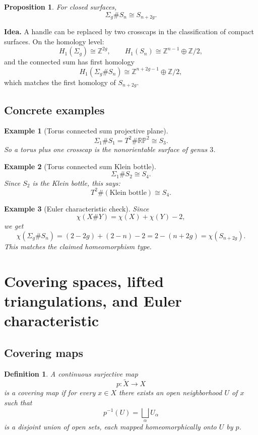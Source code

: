 \documentclass[12pt,a4paper]{article}
\newcommand{\Z}{\mathbb{Z}}
\newcommand{\RP}{\mathbb{RP}}
\newcommand{\Chi}{\chi}
\newtheorem{proposition}{Proposition}
\newtheorem{example}{Example}
\theoremstyle{notespace}
\newtheorem{definition}{Definition}[section]
\begin{document}
	\begin{proposition}
		For closed surfaces,
		\[
		\Sigma_g\#S_n\cong S_{n+2g}.
		\]
	\end{proposition}
	
	\textbf{Idea.}
	A handle can be replaced by two crosscaps in the classification of compact surfaces. On the homology level:
	\[
	H_1(\Sigma_g)\cong \Z^{2g},\qquad H_1(S_n)\cong \Z^{n-1}\oplus \Z/2,
	\]
	and the connected sum has first homology
	\[
	H_1(\Sigma_g\#S_n)\cong \Z^{n+2g-1}\oplus \Z/2,
	\]
	which matches the first homology of $S_{n+2g}$.
	
	\subsection{Concrete examples}
	
	\begin{example}[Torus connected sum projective plane]
		\[
		\Sigma_1\#S_1 = T^2\#\RP^2 \cong S_3.
		\]
		So a torus plus one crosscap is the nonorientable surface of genus $3$.
	\end{example}
	
	\begin{example}[Torus connected sum Klein bottle]
		\[
		\Sigma_1\#S_2 \cong S_4.
		\]
		Since $S_2$ is the Klein bottle, this says:
		\[
		T^2\#(\text{Klein bottle})\cong S_4.
		\]
	\end{example}
	
	\begin{example}[Euler characteristic check]
		Since
		\[
		\Chi(X\#Y)=\Chi(X)+\Chi(Y)-2,
		\]
		we get
		\[
		\Chi(\Sigma_g\#S_n)=(2-2g)+(2-n)-2=2-(n+2g)=\Chi(S_{n+2g}).
		\]
		This matches the claimed homeomorphism type.
	\end{example}
	
	\section{Covering spaces, lifted triangulations, and Euler characteristic}
	
	\subsection{Covering maps}
	
	\begin{definition}
		A continuous surjective map
		\[
		p:\widetilde X\to X
		\]
		is a \emph{covering map} if for every $x\in X$ there exists an open neighborhood $U$ of $x$ such that
		\[
		p^{-1}(U)=\bigsqcup_{\alpha} U_\alpha
		\]
		is a disjoint union of open sets, each mapped homeomorphically onto $U$ by $p$.
	\end{definition}
	
\end{document}
